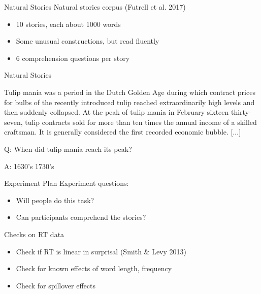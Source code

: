 \documentclass[12pt, xcolor=beamer,table,usenames,dvipsnames, ignorenonframetext, ngerman]{beamer}
\begin{document}
\begin{frame}{Natural Stories}
Natural stories corpus (Futrell et al. 2017)
\begin{itemize}
	\item 10 stories, each about 1000 words
	\item Some unusual constructions, but read fluently
	\item 6 comprehension questions per story
\end{itemize}

\end{frame}

\begin{frame}{Natural Stories}

\begin{small}Tulip mania was a period in the Dutch Golden Age during which contract prices for bulbs of the recently introduced tulip reached extraordinarily high levels and then suddenly collapsed. At the peak of tulip mania in February sixteen thirty-seven, tulip contracts sold for more than ten times the annual income of a skilled craftsman. It is generally considered the first recorded economic bubble. [...]
\medskip

Q: When did tulip mania reach its peak?

A: \hspace{3em} 1630's\hspace{3em} 1730's \end{small}

\end{frame}

\begin{frame}{Experiment Plan}
Experiment questions:
\begin{itemize}
	\item Will people do this task?
	\item Can participants comprehend the stories?
\end{itemize}

\pause

\medskip
 
Checks on RT data
\begin{itemize}
	\item Check if RT is linear in surprisal (Smith \& Levy 2013)
	\item Check for known effects of word length, frequency
	\item Check for spillover effects
\end{itemize}

\end{frame}
\end{document}
